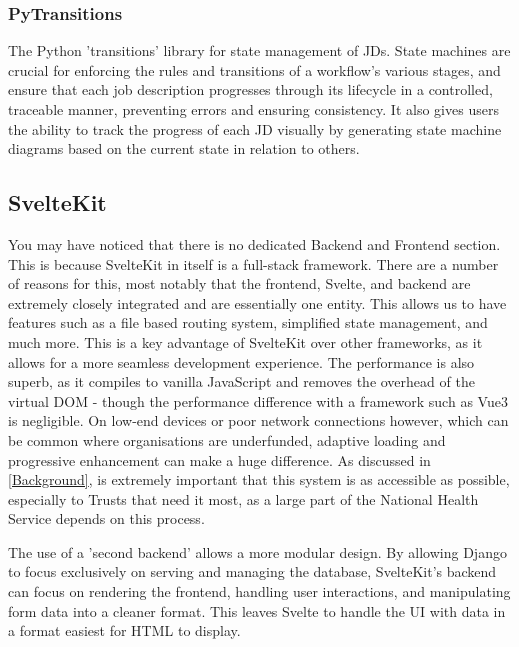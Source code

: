 \subsubsection{PyTransitions}
The Python 'transitions' library for state management of JDs. State machines are crucial for enforcing the rules and transitions of a workflow's various stages, and ensure that each job description progresses through its lifecycle in a controlled, traceable manner, preventing errors and ensuring consistency. It also gives users the ability to track the progress of each JD visually by generating state machine diagrams based on the current state in relation to others.

\subsection{SvelteKit} \label{SvelteKit}
You may have noticed that there is no dedicated Backend and Frontend section. This is because SvelteKit in itself is a full-stack framework. There are a number of reasons for this, most notably that the frontend, Svelte, and backend are extremely closely integrated and are essentially one entity. This allows us to have features such as a file based routing system, simplified state management, and much more. This is a key advantage of SvelteKit over other frameworks, as it allows for a more seamless development experience. The performance is also superb, as it compiles to vanilla JavaScript and removes the overhead of the virtual DOM - though the performance difference with a framework such as Vue3 is negligible. On low-end devices or poor network connections however, which can be common where organisations are underfunded, adaptive loading and progressive enhancement can make a huge difference. As discussed in \ref{Background}, is extremely important that this system is as accessible as possible, especially to Trusts that need it most, as a large part of the National Health Service depends on this process. 

The use of a 'second backend' allows a more modular design. By allowing Django to focus exclusively on serving and managing the database, SvelteKit's backend can focus on rendering the frontend, handling user interactions, and manipulating form data into a cleaner format. This leaves Svelte to handle the UI with data in a format easiest for HTML to display. 


